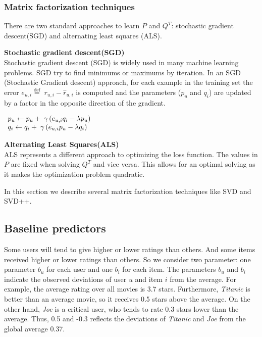 \documentclass[oneside,13pt]{extreport}
\begin{document}
\subsubsection{Matrix factorization techniques}
There are two standard approaches to learn $P$ and $Q^T$: stochastic
gradient descent(SGD) and alternating least squares (ALS).
\begin{description}
    \item{\textbf{Stochastic gradient descent(SGD)}} 
    \\Stochastic gradient descent (SGD) is widely used in many machine learning problems. SGD try to find minimums or maximums by iteration. In an SGD (Stochastic Gradient descent) approach, for each example in the training set the error ${e_{u,i}} \stackrel{\text{def}}{=} \;{r_{u,i}} - \hat r_{u,i}$ is computed and the parameters ($p_u$ and $q_i$) are updated by a factor in the opposite direction of the gradient.

$\begin{array}{l}{p_u} \leftarrow {p_u} + {\rm{\;}}\gamma \left( {{e_{u,i}}{q_i} - \lambda {p_u}} \right)\\{q_i} \leftarrow {q_i} + {\rm{\;}}\gamma \left( {{e_{u,i}}{p_u} - \lambda {q_i}} \right)\end{array}
$    
    
    \item{\textbf{Alternating Least Squares(ALS)}}
    \\ALS represents a different approach to optimizing the loss function. The values in $P$ are fixed when solving $Q^T$ and vice versa. This allows for an optimal solving as it makes the
optimization problem quadratic. 
\end{description}

In this section we describe several matrix factorization techniques like SVD and SVD++.

\subsection{Baseline predictors}
 Some users will tend to give higher or lower ratings than others. And some items received higher or lower ratings than others. So we consider two parameter: one parameter $b_u$ for each user and one $b_i$ for each item. The parameters $b_u$ and $b_i$ indicate the observed deviations of user $u$ and item $i$ from the average. For example, the average rating over all movies is 3.7 stars. Furthermore, \emph{Titanic} is better than an average movie, so it receives 0.5 stars above the average. On the other hand, \emph{Joe} is a critical user, who tends to rate 0.3 stars lower than the average. Thus, 0.5 and -0.3 reflects the deviations of \emph{Titanic} and \emph{Joe} from the global average 0.37. 
 
\end{document}
